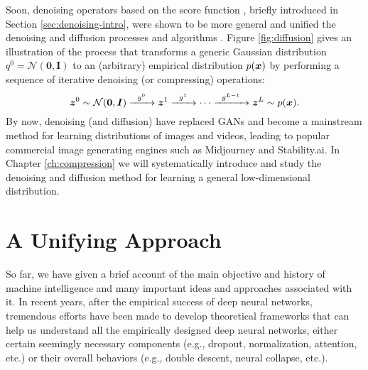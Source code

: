 \documentclass[../../book-main.tex]{subfiles}
\begin{document}
Soon, denoising operators based on the score function \cite{hyvarinen05a}, briefly introduced in Section \ref{sec:denoising-intro}, were shown to be more general and unified the denoising and diffusion processes and algorithms \cite{song2019,song2020score,ho2020denoising}. Figure \ref{fig:diffusion} gives an illustration of the process that transforms a generic Gaussian distribution $q^0 = \mathcal{N}(\boldsymbol{0}, \boldsymbol{I})$ to an (arbitrary) empirical distribution $p(\bm{x})$ by performing a sequence of iterative denoising (or compressing) operations:
\begin{equation}
        \bm{z}^0 \sim  \mathcal{N}(\boldsymbol{0}, \boldsymbol{I})\xrightarrow{\hspace{2mm} g^0  \hspace{2mm}} \bm{z}^1 \xrightarrow{\hspace{2mm} g^1 \hspace{2mm}} \cdots \xrightarrow{\hspace{2mm} g^{L-1}  \hspace{2mm}} \bm{z}^L \sim p(\bm{x}).
\end{equation}
By now, denoising (and diffusion) have replaced GANs and become a mainstream method for learning distributions of images and videos, leading to popular commercial image generating engines such as Midjourney and Stability.ai. 
In Chapter \ref{ch:compression} we will systematically introduce and study the denoising and diffusion method for learning a general low-dimensional distribution.  



\section{A Unifying Approach}\label{sec:unifying-approach}
So far, we have given a brief account of the main objective and history of machine intelligence and many important ideas and approaches associated with it. In recent years, after the empirical success of deep neural networks, tremendous efforts have been made to develop theoretical frameworks that can help us understand all the empirically designed deep neural networks, either certain seemingly necessary components (e.g., dropout,  normalization, attention, etc.) or their overall behaviors (e.g., double descent, neural collapse,  etc.). 
\end{document}
